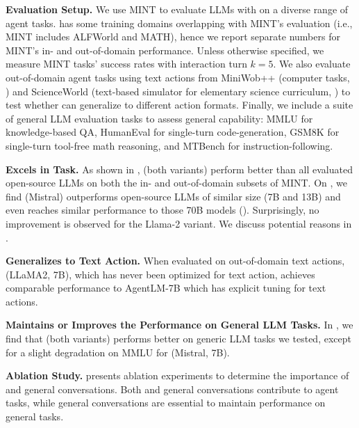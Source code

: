 \noindent \textbf{Evaluation Setup.} 
% 
We use MINT \citep{wang2023mint} to evaluate LLMs with \approach on a diverse range of agent tasks.
% 
\modelname has some training domains overlapping with MINT's evaluation (i.e., MINT includes ALFWorld and MATH), hence we report separate numbers for MINT's in- and out-of-domain performance.
%
Unless otherwise specified, we measure MINT tasks' success rates with interaction turn $k=5$.
% 
We also evaluate out-of-domain agent tasks using text actions from MiniWob++ (computer tasks, \cite{kim2023language}) and ScienceWorld (text-based simulator for elementary science curriculum, \cite{Wang2022ScienceWorldIY}) to test whether \modelname can generalize to different action formats.
% 
Finally, we include a suite of general LLM evaluation tasks to assess general capability: MMLU \citep{hendrycks2020measuring} for knowledge-based QA, HumanEval \citep{chen2021evaluating} for single-turn code-generation, GSM8K \citep{cobbe2021training} for single-turn tool-free math reasoning, and MTBench \citep{zheng2023judging} for instruction-following.

\noindent \textbf{\modelname Excels in \approach Task.}
% 
As shown in , \modelname (both variants) perform better than all evaluated open-source LLMs on both the in- and out-of-domain subsets of MINT.
% 
On \evalname, we find \modelname (Mistral) outperforms open-source LLMs of similar size (7B and 13B) and even reaches similar performance to those 70B models ().
Surprisingly, no improvement is observed for the Llama-2 variant. We discuss potential reasons in . 


\noindent \textbf{\modelname Generalizes to Text Action.}
% 
When evaluated on out-of-domain text actions, \modelname (LLaMA2, 7B), which has never been optimized for text action, achieves comparable performance to AgentLM-7B \citep{zeng2023agenttuning} which has explicit tuning for text actions.

\noindent \textbf{\modelname Maintains or Improves the Performance on General LLM Tasks.}
%
In , we find that \modelname (both variants) performs better on generic LLM tasks we tested, except for a slight degradation on MMLU for \modelname (Mistral, 7B).


\noindent \textbf{Ablation Study.}
 presents ablation experiments to determine the importance of \dataname and general conversations.
Both \dataname and general conversations contribute to agent tasks, while general conversations are essential to maintain performance on general tasks.
% 
